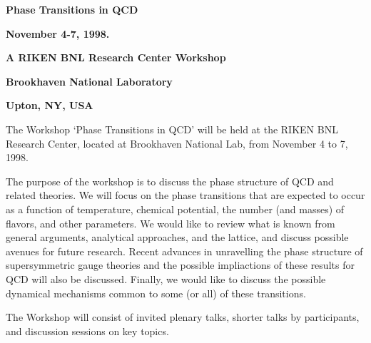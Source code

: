 

\textheight 26cm
\textwidth 16cm
\hoffset -1cm


\pagestyle{plain}



\centerline{\Large\bf Phase Transitions in QCD}
\vspace*{0.3cm}
\centerline{\large\bf November 4-7, 1998.}
\vspace*{0.8cm}
\centerline{\large\bf A RIKEN BNL Research Center Workshop}
\vspace*{0.8cm}
\centerline{\large\bf Brookhaven National Laboratory}
\vspace*{0.3cm}
\centerline{\large\bf Upton, NY, USA}
\vspace*{0.3cm}

\begin{figure}[h]
\begin{minipage}{70mm}
\epsfxsize=8cm
\end{minipage}
\hspace*{-0.5cm}
\begin{minipage}{45mm}
\epsfxsize=4.2cm
\end{minipage}
\begin{minipage}{45mm}
\epsfxsize=4cm
\end{minipage}
\end{figure}



The Workshop `Phase Transitions in QCD' will be held at the RIKEN BNL
Research Center, located at Brookhaven National Lab, from November 4 to
7, 1998. 

The purpose of the workshop is to discuss the phase structure of QCD
and related theories. We will focus on the phase transitions that are 
expected to occur as a function of temperature, chemical potential, the 
number (and masses) of flavors, and other parameters. We would like to 
review what is known from general arguments, analytical approaches, and 
the lattice, and discuss possible avenues for future research. Recent 
advances in unravelling the phase structure of supersymmetric gauge 
theories and the possible impliactions of these results for QCD will 
also be discussed. Finally, we would like to discuss the possible 
dynamical mechanisms common to some (or all) of these transitions. 


The Workshop will consist of invited plenary talks, shorter talks by
participants, and discussion sessions on key topics. \\ \\ \\ 


